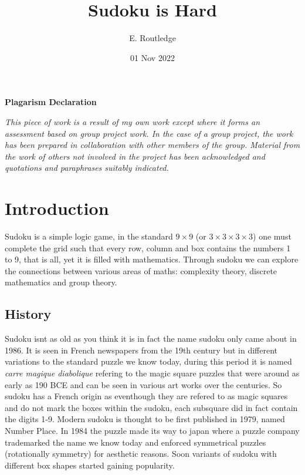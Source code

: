 \documentclass[a4paper,11pt]{report}
\author{E. Routledge}
\date{01 Nov 2022}
\title{Sudoku is Hard}
\newcounter{row}
\newcounter{col}
\begin{document}
\lstset{language=Python}

\begin{center}{\huge\textbf{Plagarism Declaration}}\end{center}
\textit{This piece of work is a result of my own work except where it forms an assessment based on group project work. In the case of a group project, the work has been prepared in collaboration with other members of the group. Material from the work of others not involved in the project has been acknowledged and quotations and paraphrases suitably indicated.}

\tableofcontents
\chapter{Introduction}

Sudoku is a simple logic game, in the standard $9 \times 9$ (or $3 \times 3 \times 3 \times 3$) one must complete the grid such that every row, column and box contains the numbers 1 to 9, that is all, yet it is filled with mathematics. Through sudoku we
can explore the connections between various areas of maths: complexity theory, discrete mathematics and group theory.

\section{History}

Sudoku isnt as old as you think it is in fact the name sudoku only came about in 1986. It is seen in French newspapers from the 19th century but in different variations to the standard puzzle we know today, during this period it is named \textit{carre magique diabolique} refering to the magic square puzzles that were around as early as 190 BCE and can be seen in various art works over the centuries. So sudoku has a French origin as eventhough they are refered to as magic squares and do not mark the boxes within the sudoku, each subsquare did in fact contain the digits 1-9. Modern sudoku is thought to be first published in 1979, named Number Place. In 1984 the puzzle made its way to japan where a puzzle company trademarked the name we know today and enforced symmetrical puzzles (rotationally symmetry) for aesthetic reasons. Soon variants of sudoku with different box shapes started gaining popularity.
\end{document}
